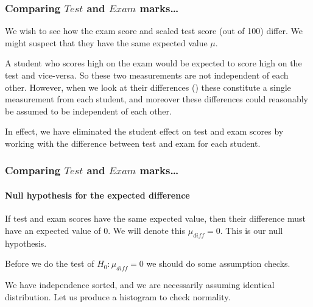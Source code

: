 \documentclass{beamer}\usepackage[]{graphicx}\usepackage[]{xcolor}
\makeatletter
\newcommand{\hlnum}[1]{\textcolor[rgb]{0.686,0.059,0.569}{#1}}%
\newcommand{\hlstr}[1]{\textcolor[rgb]{0.192,0.494,0.8}{#1}}%
\newcommand{\hlcom}[1]{\textcolor[rgb]{0.678,0.584,0.686}{\textit{#1}}}%
\newcommand{\hlopt}[1]{\textcolor[rgb]{0,0,0}{#1}}%
\newcommand{\hlstd}[1]{\textcolor[rgb]{0.345,0.345,0.345}{#1}}%
\newcommand{\hlkwb}[1]{\textcolor[rgb]{0.69,0.353,0.396}{#1}}%
\newcommand{\hlkwd}[1]{\textcolor[rgb]{0.737,0.353,0.396}{\textbf{#1}}}%
\newenvironment{kframe}{%
 \def\at@end@of@kframe{}%
 \ifinner\ifhmode%
  \def\at@end@of@kframe{\end{minipage}}%
  \begin{minipage}{\columnwidth}%
 \fi\fi%
 \def\FrameCommand##1{\hskip\@totalleftmargin \hskip-\fboxsep
 \colorbox{shadecolor}{##1}\hskip-\fboxsep
     \hskip-\linewidth \hskip-\@totalleftmargin \hskip\columnwidth}%
 \MakeFramed {\advance\hsize-\width
   \@totalleftmargin\z@ \linewidth\hsize
   \@setminipage}}%
 {\par\unskip\endMakeFramed%
 \at@end@of@kframe}
\newenvironment{knitrout}{}{} %
\makeatother
\begin{document}
\begin{frame}[fragile]
\frametitle{Comparing $Test$ and $Exam$ marks\ldots}

We wish to see how the exam score and scaled test score (out of 100) differ. 
We might suspect that they have the same expected value $\mu$. 

\medskip 

A student who scores high on the exam would be expected to score high on the test and vice-versa. 
So these two measurements are not independent of each other. 
However, when we look at their differences () these constitute a single
measurement from each student, and moreover these differences could reasonably be assumed
to be independent of each other. 
\medskip 

In effect, we have eliminated the student effect on test and exam scores by
working with the difference between test and exam for each student.
\end{frame}



\begin{frame}[fragile]
\frametitle{Comparing $Test$ and $Exam$ marks\ldots}
\framesubtitle{Null hypothesis for the expected difference}

If test and exam scores have the same expected value, then their difference must have an expected value of 0.
We will denote this $\mu_{diff}=0$. This is our null hypothesis.

\medskip

Before we do the test of $H_0: \mu_{diff}=0$ we should do some assumption checks.

We have independence sorted, and we are necessarily assuming identical distribution.
Let us produce a histogram to check normality.
\end{frame}
\end{document}
